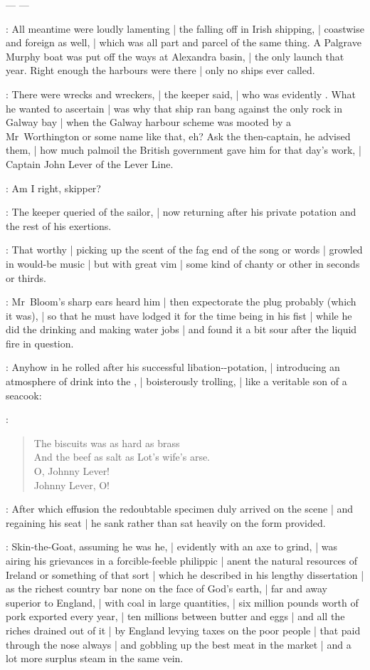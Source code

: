 ---  ---

:
All meantime were loudly lamenting |
the falling off in Irish shipping, |
coastwise and foreign as well, |
which was all part and parcel of the same thing.
A Palgrave Murphy boat was put off the ways at Alexandra basin, |
the only launch that year.
Right enough the harbours were there |
only no ships ever called.

:
There were wrecks and wreckers, |
the keeper said, |
who was evidently .
What he wanted to ascertain |
was why that ship ran bang against the only rock in Galway bay |
when the Galway harbour scheme
was mooted by a Mr~Worthington or some name like that, eh?
Ask the then-captain, he advised them, |
how much palmoil the British government gave him
for that day's work, |
Captain John Lever of the Lever Line.

\SkinTheGoat:
Am I right, skipper?

:
The keeper queried of the sailor, |
now returning after his private potation and the rest of his exertions.

:
That worthy |
picking up the scent of the fag end of the song or words |
growled in would-be music |
but with great vim |
some kind of chanty or other in seconds or thirds.

:
Mr~Bloom's sharp ears heard him |
then expectorate the plug probably (which it was), |
so that he must have lodged it for the time being in his fist |
while he did the drinking and making water jobs |
and found it a bit sour after the liquid fire in question.

:
Anyhow in he rolled after his successful libation--potation, |
introducing an atmosphere of drink into the , |
boisterously trolling, |
like a veritable son of a seacook:

\Murphy:
    \begin{verse}
      The biscuits was as hard as brass\\
      And the beef as salt as Lot's wife's arse.%
\\
      O, Johnny Lever!\\
      Johnny Lever, O!
    \end{verse}

:
After which effusion
the redoubtable specimen duly arrived on the scene |
and regaining his seat |
he sank rather than sat heavily on the form provided.

:
Skin-the-Goat, assuming he was he, |
evidently with an axe to grind, |
was airing his grievances in a forcible-feeble philippic |
anent the natural resources of Ireland or something of that sort |
which he described in his lengthy dissertation |
as the richest country bar none on the face of God's earth, |
far and away superior to England, |
with coal in large quantities, |
six million pounds worth of pork exported every year, |
ten millions between butter and eggs |
and all the riches drained out of it |
by England levying taxes on the poor people |
that paid through the nose always |
and gobbling up the best meat in the market |
and a lot more surplus steam in the same vein.

